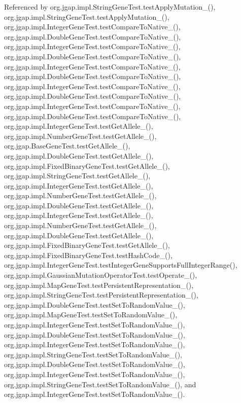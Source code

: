 Referenced by org.\-jgap.\-impl.\-String\-Gene\-Test.\-test\-Apply\-Mutation\-\_(), org.\-jgap.\-impl.\-String\-Gene\-Test.\-test\-Apply\-Mutation\-\_(), org.\-jgap.\-impl.\-Integer\-Gene\-Test.\-test\-Compare\-To\-Native\-\_(), org.\-jgap.\-impl.\-Double\-Gene\-Test.\-test\-Compare\-To\-Native\-\_(), org.\-jgap.\-impl.\-Integer\-Gene\-Test.\-test\-Compare\-To\-Native\-\_(), org.\-jgap.\-impl.\-Double\-Gene\-Test.\-test\-Compare\-To\-Native\-\_(), org.\-jgap.\-impl.\-Integer\-Gene\-Test.\-test\-Compare\-To\-Native\-\_(), org.\-jgap.\-impl.\-Double\-Gene\-Test.\-test\-Compare\-To\-Native\-\_(), org.\-jgap.\-impl.\-Integer\-Gene\-Test.\-test\-Compare\-To\-Native\-\_(), org.\-jgap.\-impl.\-Double\-Gene\-Test.\-test\-Compare\-To\-Native\-\_(), org.\-jgap.\-impl.\-Integer\-Gene\-Test.\-test\-Compare\-To\-Native\-\_(), org.\-jgap.\-impl.\-Double\-Gene\-Test.\-test\-Compare\-To\-Native\-\_(), org.\-jgap.\-impl.\-Integer\-Gene\-Test.\-test\-Get\-Allele\-\_(), org.\-jgap.\-impl.\-Number\-Gene\-Test.\-test\-Get\-Allele\-\_(), org.\-jgap.\-Base\-Gene\-Test.\-test\-Get\-Allele\-\_(), org.\-jgap.\-impl.\-Double\-Gene\-Test.\-test\-Get\-Allele\-\_(), org.\-jgap.\-impl.\-Fixed\-Binary\-Gene\-Test.\-test\-Get\-Allele\-\_(), org.\-jgap.\-impl.\-String\-Gene\-Test.\-test\-Get\-Allele\-\_(), org.\-jgap.\-impl.\-Integer\-Gene\-Test.\-test\-Get\-Allele\-\_(), org.\-jgap.\-impl.\-Number\-Gene\-Test.\-test\-Get\-Allele\-\_(), org.\-jgap.\-impl.\-Double\-Gene\-Test.\-test\-Get\-Allele\-\_(), org.\-jgap.\-impl.\-Integer\-Gene\-Test.\-test\-Get\-Allele\-\_(), org.\-jgap.\-impl.\-Number\-Gene\-Test.\-test\-Get\-Allele\-\_(), org.\-jgap.\-impl.\-Double\-Gene\-Test.\-test\-Get\-Allele\-\_(), org.\-jgap.\-impl.\-Fixed\-Binary\-Gene\-Test.\-test\-Get\-Allele\-\_(), org.\-jgap.\-impl.\-Fixed\-Binary\-Gene\-Test.\-test\-Hash\-Code\-\_(), org.\-jgap.\-impl.\-Integer\-Gene\-Test.\-test\-Integer\-Gene\-Supports\-Full\-Integer\-Range(), org.\-jgap.\-impl.\-Gaussian\-Mutation\-Operator\-Test.\-test\-Operate\-\_(), org.\-jgap.\-impl.\-Map\-Gene\-Test.\-test\-Persistent\-Representation\-\_(), org.\-jgap.\-impl.\-String\-Gene\-Test.\-test\-Persistent\-Representation\-\_(), org.\-jgap.\-impl.\-Double\-Gene\-Test.\-test\-Set\-To\-Random\-Value\-\_(), org.\-jgap.\-impl.\-Map\-Gene\-Test.\-test\-Set\-To\-Random\-Value\-\_(), org.\-jgap.\-impl.\-Integer\-Gene\-Test.\-test\-Set\-To\-Random\-Value\-\_(), org.\-jgap.\-impl.\-Double\-Gene\-Test.\-test\-Set\-To\-Random\-Value\-\_(), org.\-jgap.\-impl.\-Integer\-Gene\-Test.\-test\-Set\-To\-Random\-Value\-\_(), org.\-jgap.\-impl.\-String\-Gene\-Test.\-test\-Set\-To\-Random\-Value\-\_(), org.\-jgap.\-impl.\-Double\-Gene\-Test.\-test\-Set\-To\-Random\-Value\-\_(), org.\-jgap.\-impl.\-Integer\-Gene\-Test.\-test\-Set\-To\-Random\-Value\-\_(), org.\-jgap.\-impl.\-String\-Gene\-Test.\-test\-Set\-To\-Random\-Value\-\_(), and org.\-jgap.\-impl.\-Integer\-Gene\-Test.\-test\-Set\-To\-Random\-Value\-\_().

